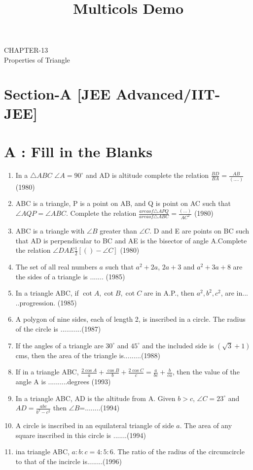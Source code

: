 \documentclass[12pt]{article}
\title{Multicols Demo}
\begin{document}
\fi
\begin{center}
\textbf\large{CHAPTER-13 \\ Properties of Triangle}

\end{center}
\section*{Section-A    [JEE Advanced/IIT-JEE]}
\section*{A    :  Fill in the Blanks}
\begin{enumerate}
\item In a $\triangle ABC$ $\angle A=90^\circ$ and AD is altitude complete the relation
$\frac{BD}{BA}=\frac{AB}{(....)}$ (1980)
\item ABC is a triangle, P is a point on AB, and Q is point on AC
such that $\angle AQP= \angle ABC$. Complete the relation
$\frac{area of \triangle APQ}{area of \triangle ABC}=\frac{(...)}{AC^2}$ 
(1980)
\item ABC is a triangle with $\angle B$ greater than $\angle C$. D and E are points on BC such that AD is perpendicular to BC and AE is the bisector of angle A.Complete the relation $\angle DAE\frac{1}{2}[()-\angle C]$ (1980)
\item The set of all real numbers $a$ such that $a^2+ 2a$, $2a +3$ and 
$a^2+3a+8$ are the sides of a triangle is ....... (1985)
\item In a triangle ABC, if $\cot A, \cot B, \cot C$ are in A.P., then
$a^2,b^2,c^2$, are in... ..progression. (1985)
\item  A polygon of nine sides, each of length 2, is inscribed in a circle. The radius of the circle is ...........(1987)
\item If the angles of a triangle are $30^\circ$ and $45^\circ$ and the included side is $(\sqrt{3} +1)$cms, then the area of the triangle is.........(1988)
\item If in a triangle ABC, $\frac{2\cos A}{a}+\frac{\cos B}{b}+\frac{2\cos C}{c}=\frac{a}{bc}+\frac{b}{ca}$, then the value of the angle A is ..........degrees (1993)
\item In a triangle ABC, AD is the altitude from A. Given $b>c$,
$\angle C=23^\circ $ and $AD=\frac{abc}{b^2-c^2}$ then $\angle B$=........(1994)
\item A circle is inscribed in an equilateral triangle of side $a$. The
area of any square inscribed in this circle is .......(1994)
\item ina triangle ABC, $a:b:c=4:5:6$. The ratio of the radius of
the circumcircle to that of the incircle is........(1996)
\end{enumerate}
\end{document}
